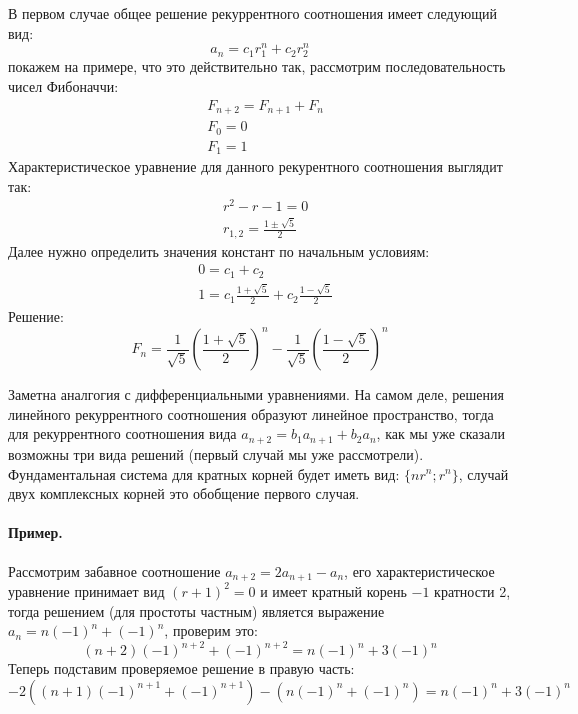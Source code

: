 В первом случае общее решение рекуррентного соотношения имеет следующий вид:
\[
	a_n = c_1 r_1^n + c_2 r_2^n
\]
покажем на примере, что это действительно так, рассмотрим последовательность чисел Фибоначчи:
\[
	\begin{split}
	& F_{n+2} = F_{n+1} + F_n \\
	& F_0 = 0 \\
	& F_1 = 1
	\end{split}
\]
Характеристическое уравнение для данного рекурентного соотношения выглядит так:
\[
	\begin{split}
		& r^2 - r - 1 = 0 \\
		& r_{1,2} = \frac{1 \pm \sqrt{5}}{2}
	\end{split}
\]
Далее нужно определить значения констант по начальным условиям:
\[
	\begin{split}
		& 0 = c_1 + c_2 \\
		& 1 = c_1 \frac{1 + \sqrt{5}}{2} + c_2 \frac{1-\sqrt{5}}{2}
	\end{split}
\]
Решение:
\[
	F_n = \frac{1}{\sqrt{5}} {\left(\frac{1+\sqrt{5}}{2}\right)}^n - \frac{1}{\sqrt{5}} {\left(\frac{1-\sqrt{5}}{2}\right)}^n
\]

Заметна аналгогия с дифференциальными уравнениями. На самом деле, решения линейного рекуррентного соотношения образуют линейное пространство, тогда для рекуррентного соотношения вида $a_{n+2} = b_1 a_{n+1} + b_2 a_n$, как мы уже сказали возможны три вида решений (первый случай мы уже рассмотрели). Фундаментальная система для кратных корней будет иметь вид: $\{nr^n; r^n\}$, случай двух комплексных корней это обобщение первого случая.

\paragraph{Пример.}
Рассмотрим забавное соотношение $a_{n+2} = 2 a_{n+1} - a_n$, его характеристическое уравнение принимает вид ${\left(r+1\right)}^2 = 0$ и имеет кратный корень $-1$ кратности 2, тогда решением (для простоты частным) является выражение $a_n = n {\left(-1\right)}^n + {\left(-1\right)}^n$, проверим это:
\[
	\left(n+2\right) {\left(-1\right)}^{n+2} + {\left(-1\right)}^{n+2} = n {\left(-1\right)}^n + 3 {\left(-1\right)}^n
\]
Теперь подставим проверяемое решение в правую часть:
\[
	-2 \left(\left(n+1\right) {\left(-1\right)}^{n+1} + {\left(-1\right)}^{n+1}\right) - \left(n {\left(-1\right)}^n + {\left(-1\right)}^n\right) = n {\left(-1\right)}^{n} + 3 {\left(-1\right)}^n
\]
